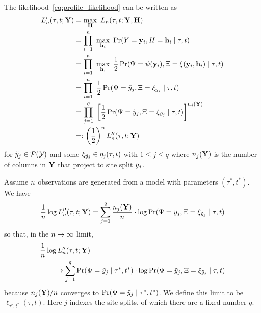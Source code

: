 The likelihood~\eqref{eq:profile_likelihood} can be written as
\begin{align}
L_\nCols'(\tau, t; \fullAlignment) &= \max_{\fullAncestralStates} \ L_\nCols(\tau, t; \fullAlignment, \fullAncestralStates) \nonumber \\
                             &= \prod_{i=1}^{\nCols} \ \max_{\ancestralStateColumn_i} \ \Pr(\alignmentColumnRV=\alignmentColumn_i, \ancestralStateColumnRV=\ancestralStateColumn_i \mid \tau, t) \nonumber \\
                             &= \prod_{i=1}^{\nCols} \ \max_{\ancestralStateColumn_i} \ \frac{1}{2}\Pr(\siteSplitRV=\patternToSplit(\alignmentColumn_i), \ancestralSplitRV=\ancestralToSplit(\alignmentColumn_i, \ancestralStateColumn_i) \mid \tau, t) \nonumber \\
                             &= \prod_{i=1}^{\nCols} \ \frac{1}{2}\Pr(\siteSplitRV=\siteSplit_j, \ancestralSplitRV=\xi_{\siteSplit_j} \mid \tau, t) \nonumber \\
                             &= \prod_{j=1}^{\nSiteSplits} \ \left[\frac{1}{2}\Pr(\siteSplitRV=\siteSplit_j, \ancestralSplitRV=\xi_{\siteSplit_j} \mid \tau, t)\right] ^{\nCols_j(\fullAlignment)} \nonumber\\
                             &=: \left(\frac{1}{2}\right)^n L_\nCols''(\tau, t; \fullAlignment) \label{eq:site_pattern_likelihood}
\end{align}
for $\tilde{y}_j\in\mathcal{P}(\mathcal{Y})$ and some $\xi_{\tilde{y}_j}\in\eta_j(\tau, t)$ with $1 \le j \le q$ where $n_j(\mathbf{Y})$ is the number of columns in $\mathbf{Y}$ that project to site split $\tilde{y}_j$.

Assume $n$ observations are generated from a model with parameters $(\tau^*, t^*)$.
We have
\begin{equation*}
\frac{1}{n} \log L_n''(\tau, t; \mathbf{Y}) = \sum_{j=1}^q \frac{n_j(\mathbf{Y})}{n}\cdot  \log \Pr(\Psi=\tilde{y}_j, \Xi=\xi_{\tilde{y}_j} \mid \tau, t)
\end{equation*}
so that, in the $n\rightarrow\infty$ limit,
\begin{equation}
\begin{split}
&    \frac{1}{n} \log L_n''(\tau, t; \mathbf{Y}) \\
&\qquad \rightarrow \sum_{j=1}^q \Pr(\Psi=\tilde{y}_j \mid \tau^*, t^*) \cdot \log \Pr(\Psi=\tilde{y}_j, \Xi=\xi_{\tilde{y}_j} \mid \tau, t) \label{eq:site_pattern_profile_likelihood_mean}
\end{split}
\end{equation}
because $n_j(\mathbf{Y})/n$ converges to $\Pr(\Psi=\tilde{y}_j \mid \tau^*, t^*)$.
We define this limit to be $\ell_{\tau^*,t^*}(\tau, t)$.
Here $j$ indexes the site splits, of which there are a fixed number $q$.


